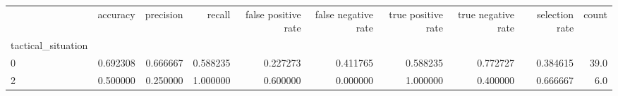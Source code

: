 \begin{tabular}{lrrrrrrrrr}
\toprule
{} &  accuracy &  precision &    recall &  false positive rate &  false negative rate &  true positive rate &  true negative rate &  selection rate &  count \\
tactical\_situation &           &            &           &                      &                      &                     &                     &                 &        \\
\midrule
0                  &  0.692308 &   0.666667 &  0.588235 &             0.227273 &             0.411765 &            0.588235 &            0.772727 &        0.384615 &   39.0 \\
2                  &  0.500000 &   0.250000 &  1.000000 &             0.600000 &             0.000000 &            1.000000 &            0.400000 &        0.666667 &    6.0 \\
\bottomrule
\end{tabular}
